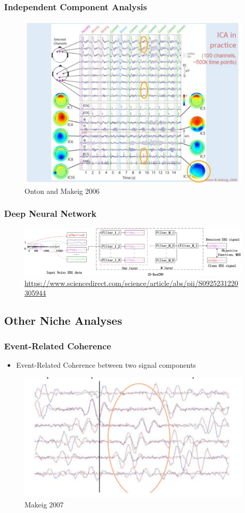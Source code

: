 \documentclass{beamer}
\begin{document}
\begin{frame}
\frametitle{Independent Component Analysis}
\begin{figure}
	\includegraphics[width=0.7\linewidth]{image/ica}
	\caption{Onton and Makeig 2006}
\end{figure}
\end{frame}

\begin{frame}
\frametitle{Deep Neural Network}
\begin{figure}
	\includegraphics[width=0.9\linewidth]{image/resnet}
	\caption{\url{https://www.sciencedirect.com/science/article/abs/pii/S0925231220305944}}
\end{figure}
\end{frame}

\subsection{Other Niche Analyses}

\begin{frame}
\frametitle{Event-Related Coherence}
\begin{itemize}
	\item Event-Related Coherence between two signal components
\end{itemize}
\begin{figure}
	\includegraphics[width=0.7\linewidth]{image/erc}
	\caption{Makeig 2007}
\end{figure}
\end{frame}
\end{document}
